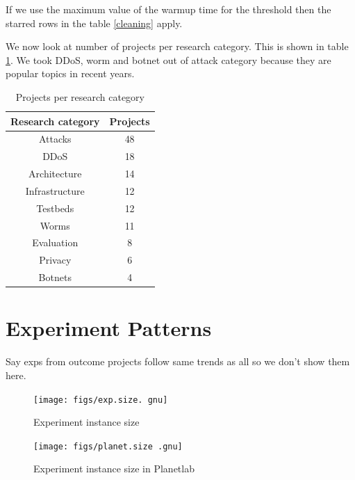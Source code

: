 \documentclass[10pt, twocolumn]{article} %
\begin{document}
If we use the maximum value of the warmup time for the threshold then
the starred rows in the table \ref{cleaning} apply.

We now look at number of projects per research category. This is shown
in table \ref{projrc}. We took DDoS, worm and botnet out of attack
category because they are popular topics in recent years.

\begin{table}[htdp] \begin{center} \begin{tabular}{|c|c|} \hline
Research category & Projects \\\hline Attacks & 48  \\ DDoS & 18 \\
Architecture & 14\\ Infrastructure & 12 \\ Testbeds & 12 \\ Worms & 11
\\ Evaluation & 8 \\ Privacy & 6 \\ Botnets & 4 \\ \hline \end{tabular}
\end{center} \caption{Projects per research category} \label{projrc}
\end{table}%


\section{Experiment Patterns}

Say exps from outcome projects follow same trends as all so we don't
show them here.

\begin{figure}[htbp] \begin{center}
\texttt{[image: figs/exp.size.
gnu]} \caption{Experiment instance size} \label{expsize} \end{center}
\end{figure}

\begin{figure}[htbp] \begin{center}
\texttt{[image: figs/planet.size
.gnu]} \caption{Experiment instance size in Planetlab} \label{expsize}
\end{center} \end{figure}
\end{document}
